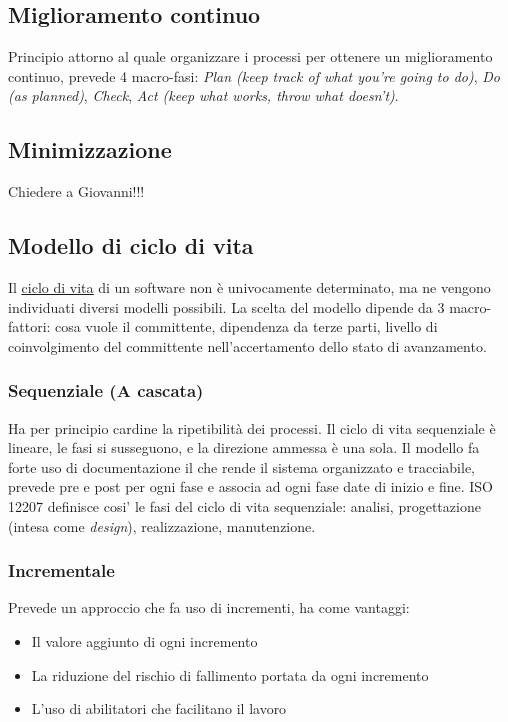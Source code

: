 	\subsection{Miglioramento continuo}
	\label{sec:miglioramentocontinuo}
	Principio attorno al quale organizzare i processi per ottenere un miglioramento continuo, prevede 4 macro-fasi:
	\emph{Plan (keep track of what you're going to do)}, \emph{Do (as planned)}, \emph{Check}, \emph{Act (keep what works, throw what doesn't)}.
	
	\subsection{Minimizzazione}
	Chiedere a Giovanni!!!
		
	\subsection{Modello di ciclo di vita}
	\label{sec:modelliciclodivita}
	Il \underline{\hyperref[sec:ciclodivita]{ciclo di vita}} di un software non è univocamente determinato, ma ne vengono individuati diversi modelli possibili. La scelta del modello dipende da 3 macro-fattori: cosa vuole il committente, dipendenza da terze parti, livello di coinvolgimento del committente nell'accertamento dello stato di avanzamento.
	
		\subsubsection{Sequenziale (A cascata)}
			Ha per principio cardine la ripetibilità dei processi.
			Il ciclo di vita sequenziale è lineare, le fasi si susseguono, e la direzione
			ammessa è una sola.
			Il modello fa forte uso di documentazione il che rende il sistema organizzato e tracciabile, prevede pre e post per ogni fase e associa ad ogni fase date di inizio e fine.  
ISO 12207 definisce cosi' le fasi del ciclo di vita sequenziale: analisi, progettazione (intesa come \textit{design}), realizzazione, manutenzione. 		
		
		\subsubsection{Incrementale}
			Prevede un approccio che fa uso di incrementi, ha come vantaggi:
			\begin{itemize}  
			\item Il valore aggiunto di ogni incremento 
			\item La riduzione del rischio di fallimento portata da ogni incremento
			\item L'uso di abilitatori che facilitano il lavoro 
			\end{itemize}			
			
